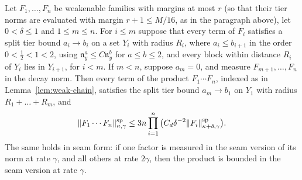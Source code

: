 \begin{lemma}\label{lem:split-chain}
Let $F_1,\dots,F_n$ be weakenable families with margins at most $r$ (so that their tier norms are evaluated with margin $r+1\le M/16$, as in the paragraph above), let $0<\delta\le1$ and $1\le m\le n$. For $i\le m$ suppose that every term of $F_i$ satisfies a split tier bound $a_i\to b_i$ on a set $Y_i$ with radius $R_i$, where $a_i\le b_{i+1}$ in the order $0<\frac12<1<2$, using $\mathfrak n^a_y\le C\mathfrak n^b_y$ for $a\le b\le2$, and every block within distance $R_i$ of $Y_i$ lies in $Y_{i+1}$, for $i<m$. If $m<n$, suppose $a_m=0$, and measure $F_{m+1},\dots,F_n$ in the decay norm. Then every term of the product $F_1\cdots F_n$, indexed as in Lemma~\ref{lem:weak-chain}, satisfies the split tier bound $a_m\to b_1$ on $Y_1$ with radius $R_1+\dots+R_m$, and
\[
\|F_1\cdots F_n\|^{\rm sp}_{\kappa,\gamma}\le3n\prod_{i=1}^n\big(C_d\delta^{-2}\|F_i\|^{\rm sp}_{\kappa+\delta,\gamma}\big).
\]
The same holds in seam form: if one factor is measured in the seam version of its norm at rate $\gamma$, and all others at rate $2\gamma$, then the product is bounded in the seam version at rate $\gamma$.
\end{lemma}

